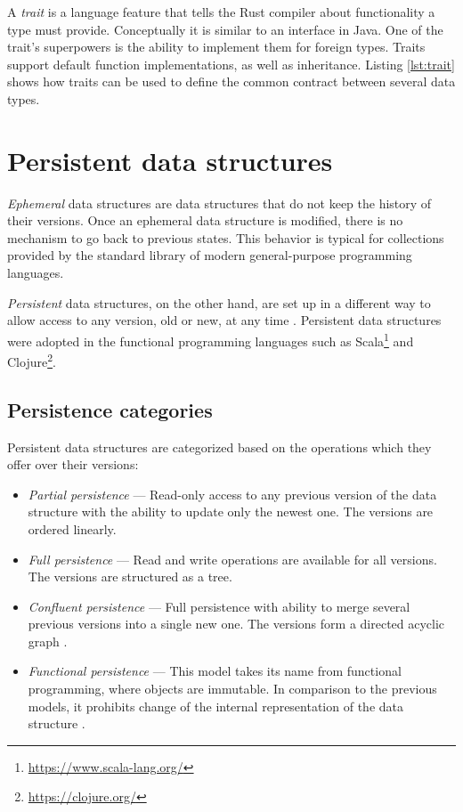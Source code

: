 A \emph{trait} is a language feature that tells the Rust compiler about functionality a type must provide. Conceptually it is similar to an interface in Java. One of the trait's superpowers is the ability to implement them for foreign types. Traits support default function implementations, as well as inheritance. Listing \ref{lst:trait} shows how traits can be used to define the common contract between several data types.

\section{Persistent data structures}
\label{sec:psds}

\emph{Ephemeral} data structures are data structures that do not keep the history of their versions. Once an ephemeral data structure is modified, there is no mechanism to go back to previous states. This behavior is typical for collections provided by the standard library of modern general-purpose programming languages.

\emph{Persistent} data structures, on the other hand, are set up in a different way to allow access to any version, old or new, at any time \cite{making-data-structures-persistent}. Persistent data structures were adopted in the functional programming languages such as Scala\footnote{\url{https://www.scala-lang.org/}} and Clojure\footnote{\url{https://clojure.org/}}.

\subsection{Persistence categories}
Persistent data structures are categorized based on the operations which they offer over their versions:
\begin{itemize}
    \item \textit{Partial persistence} --- Read-only access to any previous version of the data structure with the ability to update only the newest one. The versions are ordered linearly.
    \item \textit{Full persistence} --- Read and write operations are available for all versions. The versions are structured as a tree.
    \item \textit{Confluent persistence} --- Full persistence with ability to merge several previous versions into a single new one. The versions form a directed acyclic graph \cite{fully-persistent-lists-with-catenation}.
    \item \textit{Functional persistence} --- This model takes its name from functional programming, where objects are immutable. In comparison to the previous models, it prohibits change of the internal representation of the data structure \cite{purely-functional-data-structures}.
\end{itemize}

